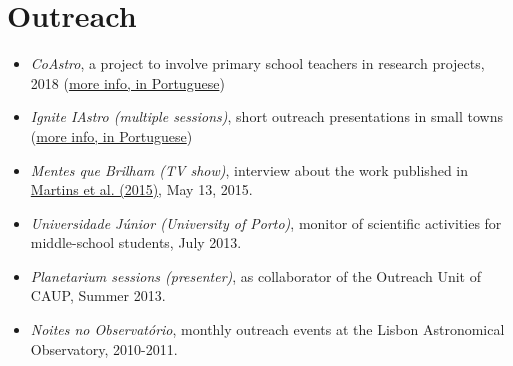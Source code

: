 \documentclass[10pt]{article}
\renewcommand{\labelenumi}{-\label{A\theenumi}}
\begin{document}
  \section{Outreach}
    \begin{itemize}
    \item \emph{CoAstro}, a project to involve primary school teachers in research projects, 2018 
          (\href{http://condominio.astro.up.pt/}{more info, in Portuguese})\\[-1.5em]
    \item \emph{Ignite IAstro (multiple sessions)}, short outreach presentations in small towns %
          (\href{http://www.iastro.pt/outreach/activities/ignite/}{more info, in Portuguese})\\[-1.5em]
    \item \emph{Mentes que Brilham (TV show)}, interview about the work published in \href{http://adsabs.harvard.edu/cgi-bin/nph-abs_connect?fforward=http://dx.doi.org/10.1051/0004-6361/201425298}{Martins et al. (2015)}, May 13, 2015. \\[-1.5em]
    \item \emph{Universidade Júnior (University of Porto)}, monitor of scientific activities for middle-school students, July 2013. \\[-1.5em]
    \item \emph{Planetarium sessions (presenter)}, as collaborator of the Outreach Unit of CAUP, Summer 2013. \\[-1.5em]
    \item \emph{Noites no Observatório}, monthly outreach events at the Lisbon Astronomical Observatory, 2010-2011.
    \end{itemize}

\fi



\newpage
\end{document}
